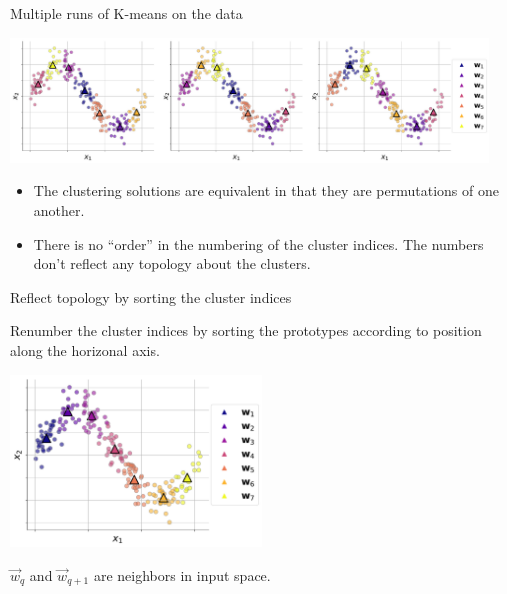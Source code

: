 \begin{frame}{Multiple runs of K-means on the data}

\begin{center}
	\includegraphics[width=0.95\textwidth]{img/sin_clustering}
\end{center}

\begin{itemize}
\item The clustering solutions are equivalent in that they are permutations of one another.
\item There is no ``order'' in the numbering of the cluster indices. The numbers don't reflect any topology about the clusters.
\end{itemize}

\end{frame}

\begin{frame}{Reflect topology by sorting the cluster indices}

Renumber the cluster indices by sorting the prototypes according to position along the horizonal axis.

\begin{center}
	\includegraphics[width=0.5\textwidth]{img/sin_clustering_sorted}
\end{center}

$\vec w_{q}$ and $\vec w_{q+1}$ are neighbors in input space.

\end{frame}


